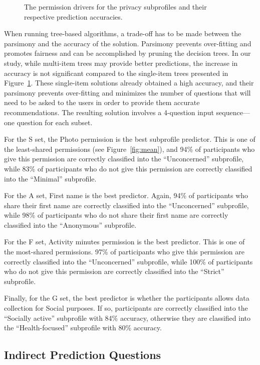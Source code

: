 \begin{figure}
	\caption{The permission drivers for the privacy subprofiles and their respective prediction accuracies.}
	\label{fig:tree1}
\end{figure} 


When running tree-based algorithms, a trade-off has to be made between the parsimony and the accuracy of the solution. Parsimony prevents over-fitting and promotes fairness and can be accomplished by pruning the decision trees. In our study, while multi-item trees may provide better predictions, the increase in accuracy is not significant compared to the single-item trees presented in Figure~\ref{fig:tree1}. These single-item solutions already obtained a high accuracy, and their parsimony prevents over-fitting and minimizes the number of questions that will need to be asked to the users in order to provide them accurate recommendations. The resulting solution involves a 4-question input sequence---one question for each subset. 

For the S set, the Photo permission is the best subprofile predictor. This is one of the least-shared permissions (see Figure~\ref{fig:mean}), and 94\% of participants who give this permission are correctly classified into the ``Unconcerned'' subprofile, while 83\% of participants who do not give this permission are correctly classified into the ``Minimal'' subprofile. 

For the A set, First name is the best predictor. Again, 94\% of participants who share their first name are correctly classified into the ``Unconcerned'' subprofile, while 98\% of participants who do not share their first name are correctly classified into the ``Anonymous'' subprofile.

For the F set, Activity minutes permission is the best predictor. This is one of the most-shared permissions. 97\% of participants who give this permission are correctly classified into the ``Unconcerned'' subprofile, while 100\% of participants who do not give this permission are correctly classified into the ``Strict'' subprofile.

Finally, for the G set, the best predictor is whether the participants allows data collection for Social purposes. If so, participants are correctly classified into the ``Socially active'' subprofile with 84\% accuracy, otherwise they are classified into the ``Health-focused'' subprofile with 80\% accuracy.


\subsection{Indirect Prediction Questions}

